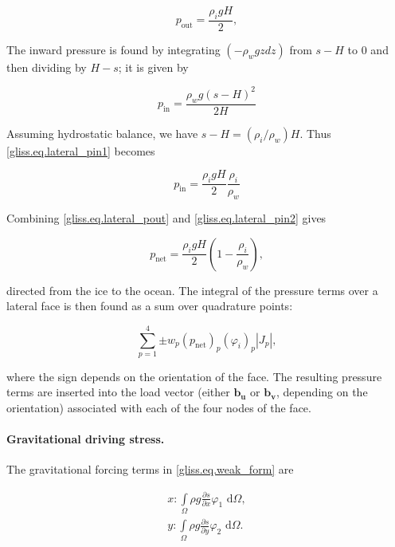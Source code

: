 \begin{equation}
  \label{gliss.eq.lateral_pout}
  p_{\text{out}} = \frac{\rho_i g H}{2},
\end{equation}

\noindent
The inward pressure is found by integrating $(-\rho_w g z dz)$ from $s-H$ to 0
and then dividing by $H-s$; it is given by

\begin{equation}
  \label{gliss.eq.lateral_pin1}
  p_{\text{in}} = \frac{\rho_w g (s-H)^2}{2H}
\end{equation}

\noindent
Assuming hydrostatic balance, we have $s-H = (\rho_i/\rho_w)H$. Thus \eqref{gliss.eq.lateral_pin1} becomes

\begin{equation}
  \label{gliss.eq.lateral_pin2}
  p_{\text{in}} = \frac{\rho_i g H}{2} \frac{\rho_i}{\rho_w}
\end{equation}

\noindent
Combining \eqref{gliss.eq.lateral_pout} and \eqref{gliss.eq.lateral_pin2} gives

\begin{equation}
  \label{gliss.eq.lateral_pnet}
  p_{\text{net}} = \frac{\rho_i g H}{2} \left(1 - \frac{\rho_i}{\rho_w}\right),
\end{equation}

\noindent
directed from the ice to the ocean.  
The integral of the pressure terms over a lateral face is then found as a sum over quadrature points:

\begin{equation}
  \label{gliss.eq.sum_over_qp_lateral}
  \sum\limits_{p=1}^{4} {\pm w_p (p_\text{net})_p (\varphi_i)_p |J_p|},
\end{equation}

\noindent
where the sign depends on the orientation of the face.  The resulting pressure terms
are inserted into the load vector (either $\mathbf{b_u}$ or $\mathbf{b_v}$, depending on the orientation)
associated with each of the four nodes of the face.

\paragraph{Gravitational driving stress.}

The gravitational forcing terms in \eqref{gliss.eq.weak_form} are

\begin{equation}
  \label{gliss.eq.gravity_forcing}
  \begin{split}
    x: \int\limits_{\Omega } {\rho g\frac{\partial s}{\partial x}} {{\varphi }_{1}}\text{ d}\Omega, \\
    y: \int\limits_{\Omega } {\rho g\frac{\partial s}{\partial y}} {{\varphi }_{2}}\text{ d}\Omega. \\
  \end{split}
\end{equation}

